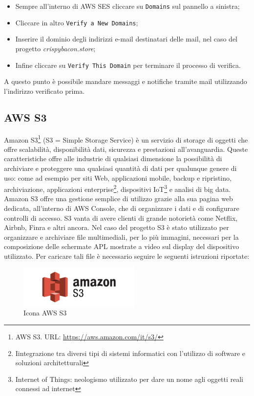 \begin{itemize}
    \item Sempre all'interno di AWS SES cliccare su \texttt{Domains} sul pannello a sinistra;
    \item Cliccare in altro \texttt{Verify a New Domains};
    \item Inserire il dominio degli indirizzi e-mail destinatari delle mail, nel caso del progetto \textit{crispybacon.store};
    \item Infine cliccare su \texttt{Verify This Domain} per terminare il processo di verifica.
\end{itemize}
A questo punto è possibile mandare messaggi e notifiche tramite mail utilizzando l'indirizzo verificato prima.
\newpage
\subsection{AWS S3}
Amazon S3\footnote{AWS S3. URL: \href{https://aws.amazon.com/it/s3/}{https://aws.amazon.com/it/s3/}} (S3 = Simple Storage Service) è un servizio di storage di oggetti che offre scalabilità, disponibilità dati, sicurezza e prestazioni all'avanguardia. Queste caratteristiche offre alle industrie di qualsiasi dimensione la possibilità di archiviare e proteggere una qualsiasi quantità di dati per qualunque genere di uso: come ad esempio per siti Web, applicazioni mobile, backup e ripristino, archiviazione, applicazioni enterprise\footnote{Iintegrazione tra diversi tipi di sistemi informatici con l'utilizzo di software e soluzioni architetturali}, dispositivi IoT\footnote{Internet of Things: neologismo utilizzato per dare un nome agli oggetti reali connessi ad internet} e analisi di big data. Amazon S3 offre una gestione semplice di utilizzo grazie alla sua pagina web dedicata, all'interno di AWS Console, che  di organizzare i dati e di configurare controlli di accesso. S3 vanta di avere clienti di grande notorietà come Netflix, Airbnb, Finra e altri ancora. Nel caso del progetto S3 è stato utilizzato per organizzare e archiviare file multimediali, per lo più immagini, necessari per la composizione delle schermate APL mostrate a video sul display del dispositivo utilizzato. Per caricare tali file è necessario seguire le seguenti istruzioni riportate:
\\[0.5cm]
\begin{minipage}{0.4\textwidth}
	\begin{figure}[H]
		\includegraphics[width=6cm]{immagini/amazon-s3.png}
		\caption{\label{fig:icona_aws_s3}Icona AWS S3}
	\end{figure}
\end{minipage}
